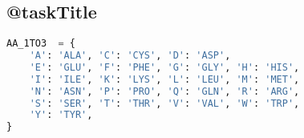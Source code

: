 \subsection{@taskTitle}
\label{task:@label}

\begin{lstlisting}[language=python, caption=Python dictionary for amino acids labels, label=lst:python_dict_for_aa]
AA_1TO3  = {
    'A': 'ALA', 'C': 'CYS', 'D': 'ASP',
    'E': 'GLU', 'F': 'PHE', 'G': 'GLY', 'H': 'HIS',
    'I': 'ILE', 'K': 'LYS', 'L': 'LEU', 'M': 'MET',
    'N': 'ASN', 'P': 'PRO', 'Q': 'GLN', 'R': 'ARG',
    'S': 'SER', 'T': 'THR', 'V': 'VAL', 'W': 'TRP',
    'Y': 'TYR',
}
\end{lstlisting}